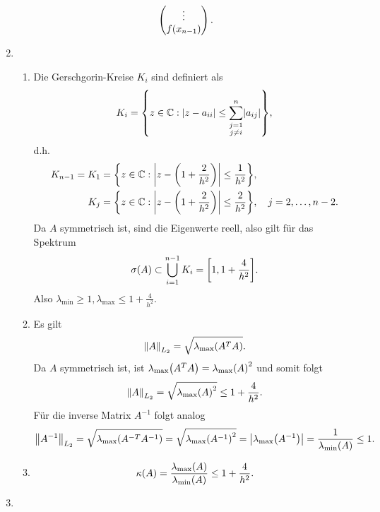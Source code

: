 \documentclass{exercise}
\begin{document}
\begin{enumerate}
\[\begin{pmatrix}
                \vdots\\
                f\parentheses*{x_{n - 1}}
            \end{pmatrix}.
        \]
        \item
        \begin{enumerate}
            \item Die Gerschgorin-Kreise \(K_i\) sind definiert als
            \[
                K_i = \braces*{z \in \C : \absolute*{z - a_{ii}} \le \sum_{\substack{j = 1\\j \ne i}}^n \absolute*{a_{ij}}},
            \]
            d.h.
            \begin{align*}
                K_{n - 1} = K_1 &= \braces*{z \in \C : \absolute*{z - \parentheses*{1 + \frac{2}{h^2}}} \le \frac{1}{h^2}},\\
                K_j &= \braces*{z \in \C : \absolute*{z - \parentheses*{1 + \frac{2}{h^2}}} \le \frac{2}{h^2}}, \quad j = 2, \ldots, n - 2.
            \end{align*}
            Da \(A\) symmetrisch ist, sind die Eigenwerte reell, also gilt für das Spektrum
            \[
                \sigma\parentheses*{A} \subset \bigcup_{i = 1}^{n - 1}K_i = \brackets*{1, 1 + \frac{4}{h^2}}.
            \]
            Also \(\lambda_{\text{min}} \ge 1, \lambda_{\text{max}} \le 1 + \frac{4}{h^2}\).
            \item Es gilt
            \[
                \norm*{A}_{L_2} = \sqrt{\lambda_{\text{max}}\parentheses*{A^T A}}.
            \]
            Da \(A\) symmetrisch ist, ist \(\lambda_{\text{max}}\parentheses*{A^T A} = \lambda_{\text{max}}\parentheses*{A}^2\) und somit folgt
            \[
                \norm*{A}_{L_2} = \sqrt{\lambda_{\text{max}}\parentheses*{A}^2} \le 1 + \frac{4}{h^2}.
            \]
            Für die inverse Matrix \(A^{-1}\) folgt analog
            \[
                \norm*{A^{-1}}_{L_2} = \sqrt{\lambda_{\text{max}}\parentheses*{A^{-T}A^{-1}}} = \sqrt{\lambda_{\text{max}}\parentheses*{A^{-1}}^2} = \absolute*{\lambda_{\text{max}}\parentheses*{A^{-1}}} = \frac{1}{\lambda_{\text{min}}\parentheses*{A}} \le 1.
            \]
            \item
            \[
                \kappa\parentheses*{A} = \frac{\lambda_{\text{max}}\parentheses*{A}}{\lambda_{\text{min}}\parentheses*{A}} \le 1 + \frac{4}{h^2}.
            \]
        \end{enumerate}
        \item
        \begin{enumerate}

\end{enumerate}
\end{enumerate}
\end{document}
